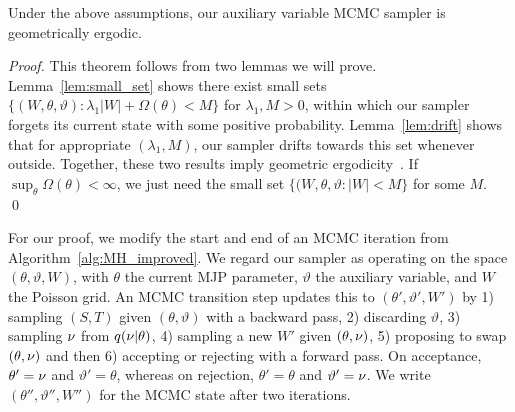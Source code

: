 

\begin{theorem}
Under the above assumptions, our auxiliary variable MCMC sampler is
geometrically ergodic.  \label{thm:geom_erg}
\end{theorem}
\begin{proof}
\noindent This theorem follows from two lemmas we will prove.
Lemma~\ref{lem:small_set} shows there exist small sets 
$\{(W,\theta,\vartheta): \lambda_1|W| + \Omega(\theta) < M \}$ for 
$\lambda_1, M > 0$, within which our sampler forgets its current state with 
some positive probability. Lemma~\ref{lem:drift}
shows that for appropriate $(\lambda_1,M)$, our sampler drifts towards this set whenever
outside. Together, these two results imply geometric
ergodicity~\citep[Theorems 15.0.1 and Lemma 15.2.8]{meyn2009}.
If $\sup_\theta \Omega(\theta) < \infty$, we just need 
the small set $\{(W,\theta,\vartheta: |W| < M \}$ for some $M$.
\qed
\end{proof}
For our proof, we modify the start and end of an MCMC iteration from 
Algorithm~\ref{alg:MH_improved}. We regard our sampler as operating on 
the space $(\theta,\vartheta,W)$,  with $\theta$ the current MJP 
parameter, $\vartheta$ the auxiliary variable, and $W$ the Poisson grid. 
An MCMC transition step updates this to $(\theta',\vartheta',W')$ by 
1) sampling $(S,T)$ given $(\theta,\vartheta)$ with a backward pass, 
2) discarding $\vartheta$, 3) sampling $\nu$ from $q(\nu|\theta)$, 
4) sampling a new $W'$ given $(\theta,\nu)$, 5) proposing to swap 
$(\theta,\nu)$ and then 6) accepting or rejecting with a forward pass. 
On acceptance, $\theta' = \nu$ and
$\vartheta' = \theta$, whereas on rejection, $\theta'=\theta$ and 
$\vartheta'=\nu$. We write $(\theta'',\vartheta'',W'')$ for the 
MCMC state after two iterations.


